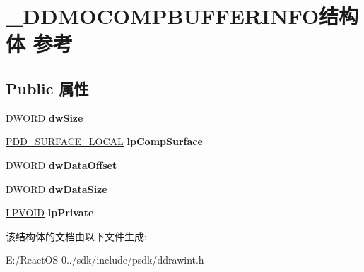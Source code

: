 \hypertarget{struct___d_d_m_o_c_o_m_p_b_u_f_f_e_r_i_n_f_o}{}\section{\+\_\+\+D\+D\+M\+O\+C\+O\+M\+P\+B\+U\+F\+F\+E\+R\+I\+N\+F\+O结构体 参考}
\label{struct___d_d_m_o_c_o_m_p_b_u_f_f_e_r_i_n_f_o}
\subsection*{Public 属性}
\begin{DoxyCompactItemize}
\item 
\mbox{\label{struct___d_d_m_o_c_o_m_p_b_u_f_f_e_r_i_n_f_o_a87faf4299d84d9a933b13260938330dc}} 
D\+W\+O\+RD {\bfseries dw\+Size}
\item 
\mbox{\label{struct___d_d_m_o_c_o_m_p_b_u_f_f_e_r_i_n_f_o_ac56e9917955902847ff14021ddf31769}} 
\hyperlink{struct___d_d___s_u_r_f_a_c_e___l_o_c_a_l}{P\+D\+D\+\_\+\+S\+U\+R\+F\+A\+C\+E\+\_\+\+L\+O\+C\+AL} {\bfseries lp\+Comp\+Surface}
\item 
\mbox{\label{struct___d_d_m_o_c_o_m_p_b_u_f_f_e_r_i_n_f_o_ac3ddaaa070b224def7e1fb39d37ff1c1}} 
D\+W\+O\+RD {\bfseries dw\+Data\+Offset}
\item 
\mbox{\label{struct___d_d_m_o_c_o_m_p_b_u_f_f_e_r_i_n_f_o_aa40c12c5fe079176bdd6a0a922ca5b3d}} 
D\+W\+O\+RD {\bfseries dw\+Data\+Size}
\item 
\mbox{\label{struct___d_d_m_o_c_o_m_p_b_u_f_f_e_r_i_n_f_o_a6e83e0f472e54bcfd1f29c9491ba480f}} 
\hyperlink{interfacevoid}{L\+P\+V\+O\+ID} {\bfseries lp\+Private}
\end{DoxyCompactItemize}


该结构体的文档由以下文件生成\+:\begin{DoxyCompactItemize}
\item 
E\+:/\+React\+O\+S-\/0../sdk/include/psdk/ddrawint.\+h\end{DoxyCompactItemize}
